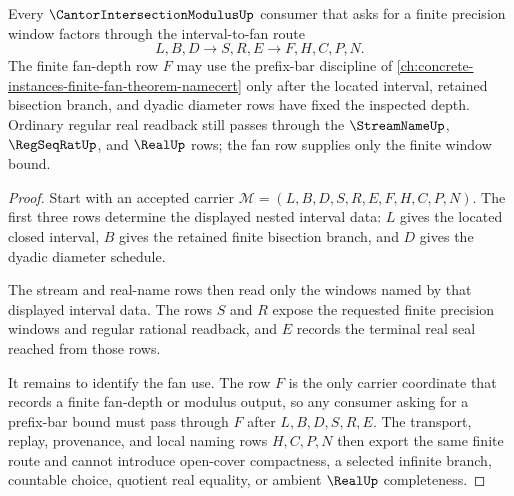 \begin{theorem}
\label{thm:cantor-intersection-modulus-fan-interval-handoff}
Every $\CantorIntersectionModulusUp$ consumer that asks for a finite precision window factors through the interval-to-fan route
$$
L,B,D \longrightarrow S,R,E \longrightarrow F,H,C,P,N.
$$
The finite fan-depth row $F$ may use the prefix-bar discipline of \autoref{ch:concrete-instances-finite-fan-theorem-namecert} only after the located interval, retained bisection branch, and dyadic diameter rows have fixed the inspected depth. Ordinary regular real readback still passes through the $\StreamNameUp$, $\RegSeqRatUp$, and $\RealUp$ rows; the fan row supplies only the finite window bound.
\end{theorem}
\begin{proof}
Start with an accepted carrier $\mathcal{M}=(L,B,D,S,R,E,F,H,C,P,N)$. The first three rows determine the displayed nested interval data: $L$ gives the located closed interval, $B$ gives the retained finite bisection branch, and $D$ gives the dyadic diameter schedule.

The stream and real-name rows then read only the windows named by that displayed interval data. The rows $S$ and $R$ expose the requested finite precision windows and regular rational readback, and $E$ records the terminal real seal reached from those rows.

It remains to identify the fan use. The row $F$ is the only carrier coordinate that records a finite fan-depth or modulus output, so any consumer asking for a prefix-bar bound must pass through $F$ after $L,B,D,S,R,E$. The transport, replay, provenance, and local naming rows $H,C,P,N$ then export the same finite route and cannot introduce open-cover compactness, a selected infinite branch, countable choice, quotient real equality, or ambient $\RealUp$ completeness.
\end{proof}



